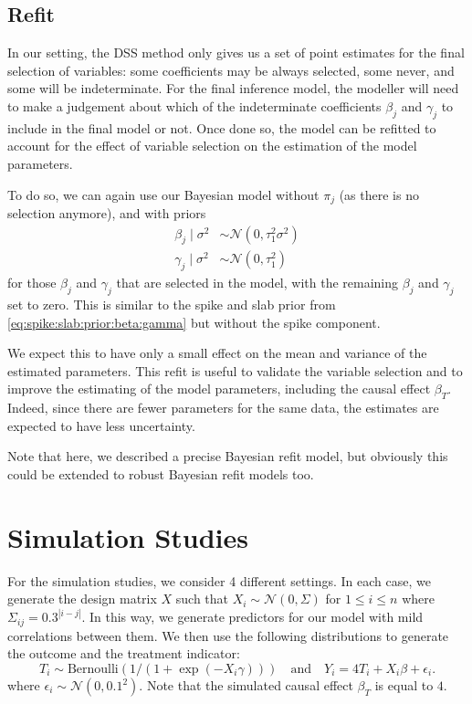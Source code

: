 \documentclass[preprint,12pt]{elsarticle}
\begin{document}
\subsection{Refit}

In our setting, the DSS method only gives us a set of point estimates for the final selection of variables: some coefficients may be always selected, some never, and some will be indeterminate. For the final inference model, the modeller will need to make a judgement about which of the indeterminate coefficients $\beta_j$ and $\gamma_j$ to include in the final model or not. Once done so, the model can be refitted to account for the effect of variable selection on the estimation of the model parameters.

To do so, we can again use our Bayesian model without $\pi_j$ (as there is no selection anymore), and with priors
\begin{align}
\beta_j\mid\sigma^2&\sim\mathcal{N}(0,\tau_1^2\sigma^2) \\
\gamma_j\mid\sigma^2&\sim\mathcal{N}(0,\tau_1^2)
\end{align}
for those $\beta_j$ and $\gamma_j$ that are selected in the model, with the remaining $\beta_j$ and $\gamma_j$ set to zero.
This is similar to the spike and slab prior from \cref{eq:spike:slab:prior:beta:gamma} but without the spike component.

We expect this to have only a small effect on the mean and variance of the estimated parameters. This refit is useful to validate the variable selection and to improve the estimating of the model parameters, including the causal effect $\beta_T$. Indeed, since there are fewer parameters for the same data, the estimates are expected to have less uncertainty.

Note that here, we described a precise Bayesian refit model, but obviously this could be extended to robust Bayesian refit models too.

\section{Simulation Studies}\label{sec:sim}

For the simulation studies, we consider 4 different settings. In each
case, we generate the design matrix $X$ such that $X_i\sim\mathcal{N}(0, \Sigma)$
for $1\le i\le n$ where $\Sigma_{ij} = 0.3^{|i-j|}$. In this way, we 
generate predictors for our model with mild correlations between them.
We then use the following distributions to generate the outcome and
the treatment indicator: 
\begin{equation}
    T_i \sim \text{Bernoulli}\left(1/(1+\exp(-X_i\gamma))\right)
    \quad\text{and}\quad
    Y_i = 4T_i + X_i\beta + \epsilon_i.
\end{equation}
where $\epsilon_i\sim\mathcal{N}(0,0.1^2)$.
Note that the simulated causal effect $\beta_T$ is equal to $4$.
\end{document}

